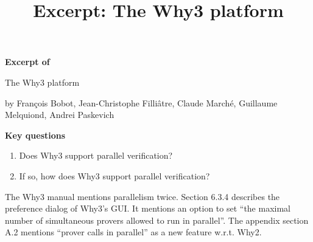 \documentclass{scrartcl}
\title{Excerpt: The Why3 platform}
\begin{document}
\begin{center}
\Large{\textbf{Excerpt of}}

\LARGE{The Why3 platform}

\large{by François Bobot, Jean-Christophe Filliâtre, Claude Marché, Guillaume Melquiond, Andrei Paskevich}
\end{center}

\vspace{1cm}

\begin{addmargin}[0.2\linewidth]{0.2\linewidth}
\begin{center}
\textbf{Key questions}
\end{center}
\begin{enumerate}[i]
  \item Does Why3 support parallel verification?
  \item If so, how does Why3 support parallel verification?
\end{enumerate}
\end{addmargin}

\vspace{1cm}

The Why3 manual mentions parallelism twice.
Section 6.3.4 describes the preference dialog of Why3's GUI.
It mentions an option to set \enquote{the maximal number of simultaneous provers allowed to run in parallel}.
The appendix section A.2 mentions \enquote{prover calls in parallel} as a new feature w.r.t. Why2.
\end{document}
